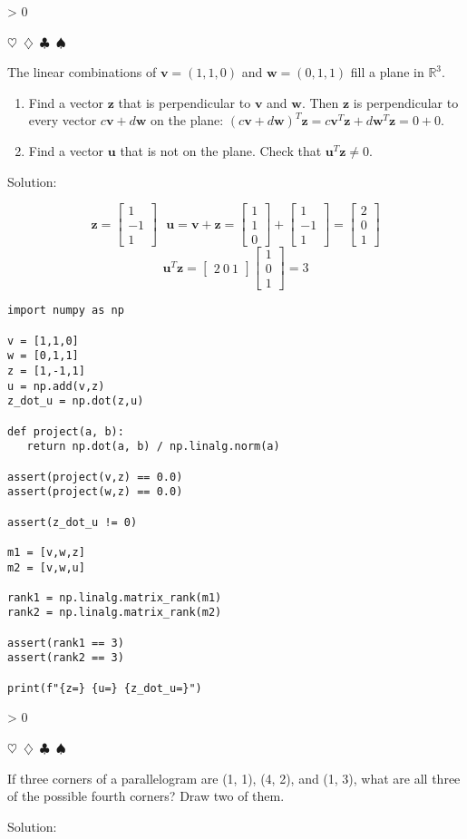 \documentclass{article}
\newcommand{\sep}{\begin{center}$\heartsuit$~$\diamondsuit$~$\clubsuit$~$\spadesuit$\end{center}}
\newcommand{\sol}{\begin{center}\small{Solution:}\end{center}}
\newcommand{\vect}[1]{\ensuremath{\boldsymbol{#1}}}
\newcounter{prblm}
\newcommand{\problem}[1]{
  \ifnum\value{prblm} > 0 \sep \fi
  \stepcounter{prblm}
  \noindent\textbf{\arabic{prblm}} #1
  \sol
}
\begin{document}
\problem{The linear combinations of $\vect{v} = (1, 1, 0)$ and $\vect{w} = (0, 1, 1)$ fill a plane in $\mathbb{R}^3$.
\begin{enumerate}[label=(\alph*)]
\item Find a vector $\vect{z}$ that is perpendicular to $\vect{v}$ and $\vect{w}$. Then $\vect{z}$ is perpendicular to every vector $c\vect{v} + d\vect{w}$ on the plane: $(c\vect{v} + d\vect{w})^T \vect{z} = c\vect{v}^T\vect{z} + d\vect{w}^T\vect{z} = 0 + 0$. 
\item Find a vector $\vect{u}$ that is not on the plane. Check that $\vect{u}^T\vect{z} \not= 0$.
\end{enumerate}}


\begin{displaymath}
  \vect{z} = \begin{bmatrix} 1 \\ -1 \\ 1 \end{bmatrix}
  ~~~
  \vect{u} = \vect{v} + \vect{z} = \begin{bmatrix} 1 \\ 1 \\ 0 \end{bmatrix} + \begin{bmatrix} 1 \\ -1 \\ 1 \end{bmatrix} = \begin{bmatrix} 2 \\ 0 \\ 1 \end{bmatrix}
\end{displaymath}
\begin{displaymath}
  \vect{u}^T\vect{z} = \begin{bmatrix} 2 ~ 0 ~ 1 \end{bmatrix} \begin{bmatrix} 1 \\ 0 \\ 1 \end{bmatrix} = 3
\end{displaymath}

\begin{verbatim}
import numpy as np

v = [1,1,0]
w = [0,1,1]
z = [1,-1,1]
u = np.add(v,z)
z_dot_u = np.dot(z,u)

def project(a, b):
   return np.dot(a, b) / np.linalg.norm(a)

assert(project(v,z) == 0.0)
assert(project(w,z) == 0.0)

assert(z_dot_u != 0)

m1 = [v,w,z]
m2 = [v,w,u]

rank1 = np.linalg.matrix_rank(m1)
rank2 = np.linalg.matrix_rank(m2)

assert(rank1 == 3)
assert(rank2 == 3)

print(f"{z=} {u=} {z_dot_u=}")
\end{verbatim}

\problem{If three corners of a parallelogram are (1, 1), (4, 2), and (1, 3), what are all three of the possible fourth corners? Draw two of them.}
\end{document}
